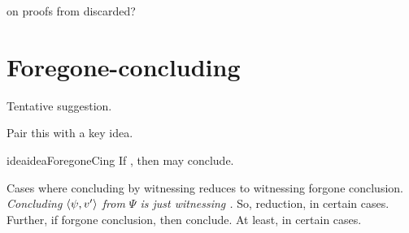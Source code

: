 \begin{note}
  \citeauthor{Easwaran:2009tm} on proofs from discarded?
\end{note}

\section{Foregone-concluding}

\begin{note}
  Tentative suggestion.
\end{note}

\begin{note}
  Pair this with a key idea.

  \begin{restatable}{idea}{ideaForegoneCing}
    \label{idea:reassignment}
    If \fc{}, then may conclude.
  \end{restatable}

  Cases where concluding by witnessing reduces to witnessing forgone conclusion.
  \emph{Concluding \(\langle \psi, v' \rangle\) from \(\Psi\) is just witnessing \fc{}.}
  So, reduction, in certain cases.
  Further, if forgone conclusion, then conclude.
  At least, in certain cases.
\end{note}


